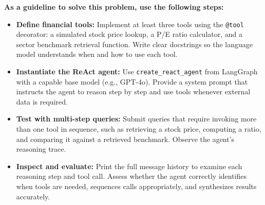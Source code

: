 \documentclass{article}
\begin{document}
\textbf{As a guideline to solve this problem, use the following steps:}
\begin{itemize}
    \item \textbf{Define financial tools:} Implement at least three tools using the \texttt{@tool} decorator: a simulated stock price lookup, a P/E ratio calculator, and a sector benchmark retrieval function. Write clear docstrings so the language model understands when and how to use each tool.
    \item \textbf{Instantiate the ReAct agent:} Use \texttt{create\_react\_agent} from LangGraph with a capable base model (e.g., GPT-4o). Provide a system prompt that instructs the agent to reason step by step and use tools whenever external data is required.
    \item \textbf{Test with multi-step queries:} Submit queries that require invoking more than one tool in sequence, such as retrieving a stock price, computing a ratio, and comparing it against a retrieved benchmark. Observe the agent's reasoning trace.
    \item \textbf{Inspect and evaluate:} Print the full message history to examine each reasoning step and tool call. Assess whether the agent correctly identifies when tools are needed, sequences calls appropriately, and synthesizes results accurately.
\end{itemize}



\end{document}
